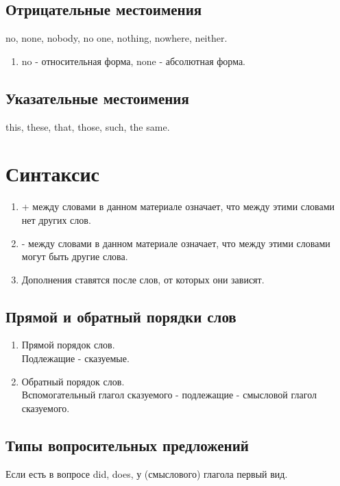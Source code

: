\documentclass[oneside]{book}
\begin{document}
\section{Отрицательные местоимения}
no, none, nobody, no one, nothing, nowhere,
neither.

\begin{enumerate}
    \item no - относительная форма,
    none - абсолютная форма.
\end{enumerate}

\section{Указательные местоимения}
this, these, that, those, such, the same.

\chapter{Синтаксис}
\begin{enumerate}
    \item + между словами в данном материале означает,
    что между этими словами нет других слов.

    \item {}-{} между словами в данном материале означает,
    что между этими словами могут быть другие слова.

    \item Дополнения ставятся после слов, от которых они зависят.
\end{enumerate}

\section{Прямой и обратный порядки слов}
\begin{enumerate}
    \item Прямой порядок слов. \\
    Подлежащие - сказуемые.

    \item Обратный порядок слов. \\
    Вспомогательный глагол сказуемого - подлежащие - смысловой глагол сказуемого.
\end{enumerate}

\section{Типы вопросительных предложений}
Если есть в вопросе did, does, у (смыслового) глагола первый вид.
\end{document}
